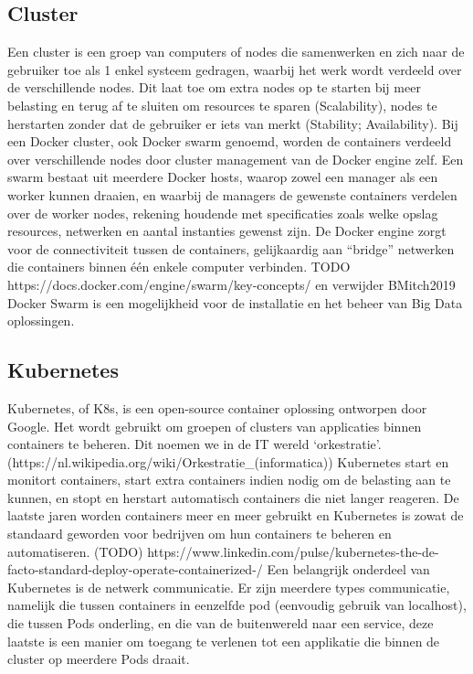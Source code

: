 \subsection{Cluster}
Een cluster is een groep van computers of nodes die samenwerken en zich naar de gebruiker toe als 1 enkel systeem gedragen, waarbij het werk wordt verdeeld over de verschillende nodes. Dit laat toe om extra nodes op te starten bij meer belasting en terug af te sluiten om resources te sparen (Scalability), nodes te herstarten zonder dat de gebruiker er iets van merkt (Stability; Availability).\textcite{Nordhoff2020}
\newline
\newline
Bij een Docker cluster, ook Docker swarm genoemd, worden de containers verdeeld over verschillende nodes door cluster management van de Docker engine zelf. Een swarm bestaat uit meerdere Docker hosts, waarop zowel een manager als een worker kunnen draaien, en waarbij de managers de gewenste containers verdelen over de worker nodes, rekening houdende met specificaties zoals welke opslag resources, netwerken en aantal instanties gewenst zijn. De Docker engine zorgt voor de connectiviteit tussen de containers, gelijkaardig aan ``bridge'' netwerken die containers binnen één enkele computer verbinden.\textcite{BMitch2019}
TODO https://docs.docker.com/engine/swarm/key-concepts/ en verwijder BMitch2019
\newline
\newline
Docker Swarm is een mogelijkheid voor de installatie en het beheer van Big Data oplossingen.
\newline
\newline


\subsection{Kubernetes}
Kubernetes, of K8s, is een open-source container oplossing ontworpen door Google. Het wordt gebruikt om groepen of clusters van applicaties binnen containers te beheren. Dit noemen we in de IT wereld ‘orkestratie’. (https://nl.wikipedia.org/wiki/Orkestratie_(informatica))
\newline
Kubernetes start en monitort containers, start extra containers indien nodig om de belasting aan te kunnen, en stopt en herstart automatisch containers die niet langer reageren.\textcite{Guthrie2022}
\newline
\newline
De laatste jaren worden containers meer en meer gebruikt en Kubernetes is zowat de standaard geworden voor bedrijven om hun containers te beheren en automatiseren.
(TODO) https://www.linkedin.com/pulse/kubernetes-the-de-facto-standard-deploy-operate-containerized-/
\newline
\newline
Een belangrijk onderdeel van Kubernetes is de netwerk communicatie. Er zijn meerdere types communicatie, namelijk die tussen containers in eenzelfde pod (eenvoudig gebruik van localhost), die tussen Pods onderling, en die van de buitenwereld naar een service, deze laatste is een manier om toegang te verlenen tot een applikatie die binnen de cluster op meerdere Pods draait.

